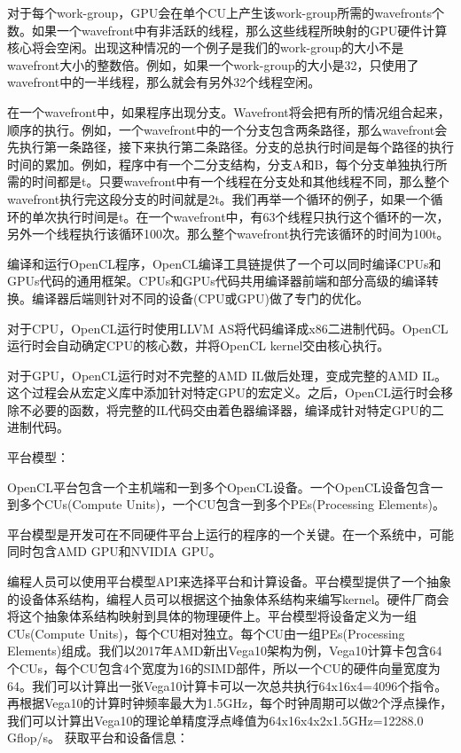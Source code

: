 对于每个work-group，GPU会在单个CU上产生该work-group所需的wavefronts个数。如果一个wavefront中有非活跃的线程，那么这些线程所映射的GPU硬件计算核心将会空闲。出现这种情况的一个例子是我们的work-group的大小不是wavefront大小的整数倍。例如，如果一个work-group的大小是32，只使用了wavefront中的一半线程，那么就会有另外32个线程空闲。

在一个wavefront中，如果程序出现分支。Wavefront将会把有所的情况组合起来，顺序的执行。例如，一个wavefront中的一个分支包含两条路径，那么wavefront会先执行第一条路径，接下来执行第二条路径。分支的总执行时间是每个路径的执行时间的累加。例如，程序中有一个二分支结构，分支A和B，每个分支单独执行所需的时间都是t。只要wavefront中有一个线程在分支处和其他线程不同，那么整个wavefront执行完这段分支的时间就是2t。我们再举一个循环的例子，如果一个循环的单次执行时间是t。在一个wavefront中，有63个线程只执行这个循环的一次，另外一个线程执行该循环100次。那么整个wavefront执行完该循环的时间为100t。

编译和运行OpenCL程序，OpenCL编译工具链提供了一个可以同时编译CPUs和GPUs代码的通用框架。CPUs和GPUs代码共用编译器前端和部分高级的编译转换。编译器后端则针对不同的设备(CPU或GPU)做了专门的优化。

对于CPU，OpenCL运行时使用LLVM AS将代码编译成x86二进制代码。OpenCL运行时会自动确定CPU的核心数，并将OpenCL kernel交由核心执行。

对于GPU，OpenCL运行时对不完整的AMD IL做后处理，变成完整的AMD IL。这个过程会从宏定义库中添加针对特定GPU的宏定义。之后，OpenCL运行时会移除不必要的函数，将完整的IL代码交由着色器编译器，编译成针对特定GPU的二进制代码。

平台模型：

OpenCL平台包含一个主机端和一到多个OpenCL设备。一个OpenCL设备包含一到多个CUs(Compute Units)，一个CU包含一到多个PEs(Processing Elements)。

平台模型是开发可在不同硬件平台上运行的程序的一个关键。在一个系统中，可能同时包含AMD GPU和NVIDIA GPU。

编程人员可以使用平台模型API来选择平台和计算设备。平台模型提供了一个抽象的设备体系结构，编程人员可以根据这个抽象体系结构来编写kernel。硬件厂商会将这个抽象体系结构映射到具体的物理硬件上。平台模型将设备定义为一组CUs(Compute Units)，每个CU相对独立。每个CU由一组PEs(Processing Elements)组成。我们以2017年AMD新出Vega10架构为例，Vega10计算卡包含64个CUs，每个CU包含4个宽度为16的SIMD部件，所以一个CU的硬件向量宽度为64。我们可以计算出一张Vega10计算卡可以一次总共执行64x16x4=4096个指令。再根据Vega10的计算时钟频率最大为1.5GHz，每个时钟周期可以做2个浮点操作，我们可以计算出Vega10的理论单精度浮点峰值为64x16x4x2x1.5GHz=12288.0 Gflop/s。
获取平台和设备信息：

